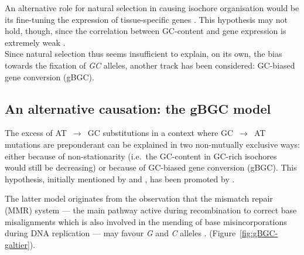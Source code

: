 An alternative role for natural selection in causing isochore organisation would be its fine-tuning the expression of tissue-specific genes \citep{vinogradov2003isochores,vinogradov2005noncoding}.
This hypothesis may not hold, though, since the correlation between GC-content and gene expression is extremely weak \citep[reviewed in \citealp{duret2009biased}]{semon2005relationship,semon2006no,pouyet2017recombination}.\\


Since natural selection thus seems insufficient to explain, on its own, the bias towards the fixation of \textit{GC} alleles, another track has been considered: GC-biased gene conversion (gBGC).





\subsection{An alternative causation: the gBGC model}

The excess of AT~$\rightarrow$~GC substitutions in a context where GC~$\rightarrow$~AT mutations are preponderant can be explained in two non-mutually exclusive ways: either because of non-stationarity (i.e.\ the GC-content in GC-rich isochores would still be decreasing) or because of GC-biased gene conversion (gBGC).
This hypothesis, initially mentioned by \citet{holmquist1992chromosome} and \citet{eyre-walker1993recombination,eyre-walker1999evidence}, has been promoted by \citet{galtier2001gccontent}.

The latter model originates from the observation that the mismatch repair (MMR) system — the main pathway active during recombination to correct base misalignments \citep[reviewed in \citealp{evans2000roles} and \citealp{spies2015mismatch}]{alani1994interaction,nicolas1994polarity} which is also involved in the mending of base misincorporations during DNA replication \citep{surtees2004mismatch} — may favour \textit{G} and \textit{C} alleles \citep{brown1988different,bill1998efficient}. (Figure~\ref{fig:gBGC-galtier}). \\


